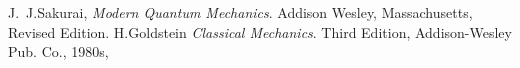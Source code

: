 \begin{thebibliography}{9}

  J.~J.Sakurai,
  \emph{Modern Quantum Mechanics}.
  Addison Wesley, Massachusetts,
  Revised Edition.
  H.Goldstein 
  \emph{Classical Mechanics}.
  Third Edition,
  Addison-Wesley Pub. Co., 1980s,
  
\end{thebibliography}